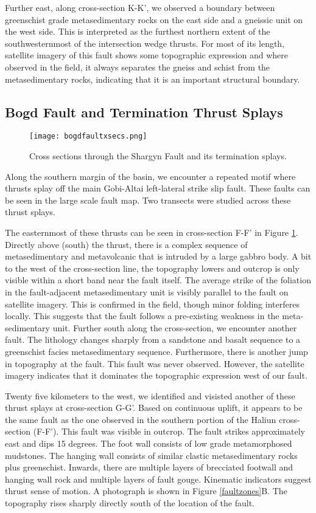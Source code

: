 \documentclass[10pt,a4paper]{article}
\begin{document}
Further east, along cross-section K-K', we observed a boundary between greenschist grade metasedimentary rocks on the east side and a gneissic unit on the west side. This is interpreted as the furthest northern extent of the southwesternmost of the intersection wedge thrusts. For most of its length, satellite imagery of this fault shows some topographic expression and where observed in the field, it always separates the gneiss and schist from the metasedimentary rocks, indicating that it is an important structural boundary. 

\subsection{Bogd Fault and Termination Thrust Splays}

\begin{figure}[h!]
  \centering
  \texttt{[image: bogdfaultxsecs.png]}
  \caption{Cross sections through the Shargyn Fault and its termination splays.}
  \label{bogdfaultxsecs}
\end{figure}

Along the southern margin of the basin, we encounter a repeated motif where thrusts splay off the main Gobi-Altai left-lateral strike slip fault. These faults can be seen in the large scale fault map. Two transects were studied across these thrust splays. 

The easternmost of these thrusts can be seen in cross-section F-F' in Figure \ref{bogdfaultxsecs}. Directly above (south) the thrust, there is a complex sequence of metasedimentary and metavolcanic that is intruded by a large gabbro body. A bit to the west of the cross-section line, the topography lowers and outcrop is only visible within a short band near the fault itself. The average strike of the foliation in the fault-adjacent metasedimentary unit is visibly parallel to the fault on satellite imagery. This is confirmed in the field, though minor folding interferes locally. This suggests that the fault follows a pre-existing weakness in the meta-sedimentary unit. Further south along the cross-section, we encounter another fault. The lithology changes sharply from a sandstone and basalt sequence to a greenschist facies metasedimentary sequence. Furthermore, there is another jump in topography at the fault. This fault was never observed. However, the satellite imagery indicates that it dominates the topographic expression west of our fault. 

Twenty five kilometers to the west, we identified and visisted another of these thrust splays at cross-section G-G'. Based on continuous uplift, it appears to be the same fault as the one observed in the southern portion of the Haliun cross-section (F-F'). This fault was visible in outcrop. The fault strikes approximately east and dips 15 degrees. The foot wall consists of low grade metamorphosed mudstones. The hanging wall consists of similar clastic metasedimentary rocks plus greenschist. Inwards, there are multiple layers of brecciated footwall and hanging wall rock and multiple layers of fault gouge. Kinematic indicators suggest thrust sense of motion. A photograph is shown in Figure \ref{faultzones}B. The topography rises sharply directly south of the location of the fault.
\end{document}
